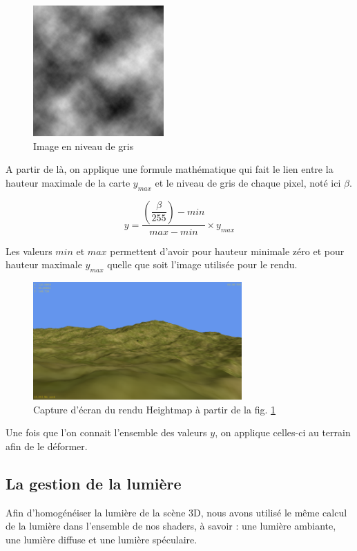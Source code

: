 \documentclass[11pt]{report}
\begin{document}
\begin{figure}[htbp]
\centering
\includegraphics[width=5cm]{heightmap-texture.png}
\caption{Image en niveau de gris}
\label{fig-heightmap-texture}
\end{figure}

A partir de là, on applique une formule mathématique qui fait le lien entre la hauteur maximale de la carte \( y_{max} \) et le niveau de gris de chaque pixel, noté ici \( \beta \).

\[
y = \dfrac{\left(\dfrac{\beta}{255}\right) - min}{max - min} \times y_{max}
\]

Les valeurs \( min \) et \( max \) permettent d'avoir pour hauteur minimale zéro et pour hauteur maximale \( y_{max} \) quelle que soit l'image utilisée pour le rendu.

\begin{figure}[htbp]
\centering
\includegraphics[width=8cm]{heightmap-rendu.png}
\caption{Capture d'écran du rendu Heightmap à partir de la fig. \ref{fig-heightmap-texture}}
\end{figure}

Une fois que l'on connait l'ensemble des valeurs \( y \), on applique celles-ci au terrain afin de le déformer.

\subsection{La gestion de la lumière}

Afin d'homogénéiser la lumière de la scène 3D, nous avons utilisé le même calcul de la lumière dans l'ensemble de nos shaders, à savoir : une lumière ambiante, une lumière diffuse et une lumière spéculaire.
\end{document}
